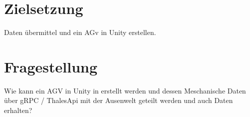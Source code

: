 \section{Zielsetzung}
Daten übermittel und ein AGv in Unity erstellen.

\section{Fragestellung}

Wie kann ein AGV in Unity in erstellt werden und dessen Meschanische Daten über gRPC / ThalesApi mit der Ausenwelt geteilt werden und auch Daten erhalten? 